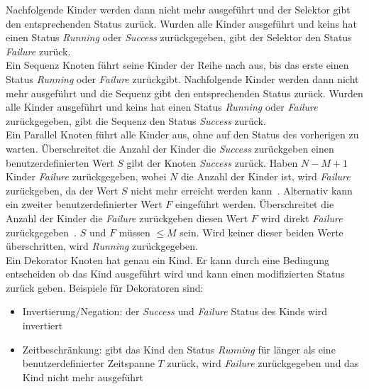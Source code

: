 Nachfolgende Kinder werden dann nicht mehr ausgeführt und der Selektor gibt den entsprechenden Status zurück.
Wurden alle Kinder ausgeführt und keins hat einen Status \emph{Running} oder \emph{Success} zurückgegeben, gibt der Selektor den Status \emph{Failure} zurück.\\
Ein Sequenz Knoten führt seine Kinder der Reihe nach aus, bis das erste einen Status \emph{Running} oder \emph{Failure} zurückgibt.
Nachfolgende Kinder werden dann nicht mehr ausgeführt und die Sequenz gibt den entsprechenden Status zurück.
Wurden alle Kinder ausgeführt und keins hat einen Status \emph{Running} oder \emph{Failure} zurückgegeben, gibt die Sequenz den Status \emph{Success} zurück.\\
Ein Parallel Knoten führt alle Kinder aus, ohne auf den Status des vorherigen zu warten.
Überschreitet die Anzahl der Kinder die \emph{Success} zurückgeben einen benutzerdefinierten Wert $S$ gibt der Knoten \emph{Success} zurück.
Haben $N-M+1$ Kinder \emph{Failure} zurückgegeben, wobei $N$ die Anzahl der Kinder ist, wird \emph{Failure} zurückgeben, da der Wert $S$ nicht mehr erreicht werden kann~\cite{bt_book}.
Alternativ kann ein zweiter benutzerdefinierter Wert $F$ eingeführt werden.
Überschreitet die Anzahl der Kinder die \emph{Failure} zurückgeben diesen Wert $F$ wird direkt \emph{Failure} zurückgegeben~\cite{bt_1}.
$S$ und $F$ müssen $\leq M$ sein.
Wird keiner dieser beiden Werte überschritten, wird \emph{Running} zurückgegeben.\\
Ein Dekorator Knoten hat genau ein Kind.
Er kann durch eine Bedingung entscheiden ob das Kind ausgeführt wird und kann einen modifizierten Status zurück geben.
Beispiele für Dekoratoren sind:
\begin{itemize}
    \item Invertierung/Negation: der \emph{Success} und \emph{Failure} Status des Kinds wird invertiert
    \item Zeitbeschränkung: gibt das Kind den Status \emph{Running} für länger als eine benutzerdefinierter Zeitspanne $T$ zurück, wird \emph{Failure} zurückgegeben und das Kind nicht mehr ausgeführt
\end{itemize}\cite{bt_book}

